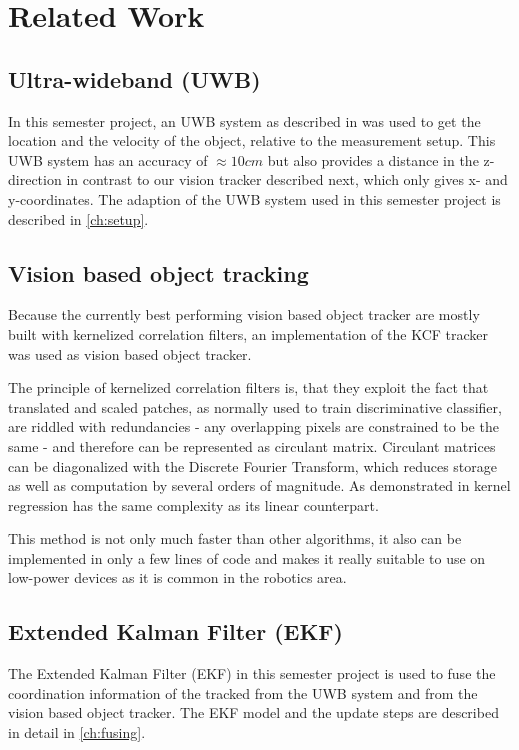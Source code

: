 
\setcounter{chapter}{1}

\chapter{Related Work}

\section{Ultra-wideband (UWB)}
In this semester project, an UWB system as described in   was used to get the location and the velocity of the object, relative to the measurement setup. This UWB system has an accuracy of $\approx 10 cm$ but also provides a distance in the z-direction in contrast to our vision tracker described next, which only gives x- and y-coordinates. The adaption of the UWB system used in this semester project is described in \autoref{ch:setup}.

\section{Vision based object tracking}
Because the currently best performing vision based object tracker are mostly built with kernelized correlation filters, an implementation of the KCF tracker \cite{henriques2015tracking} was used as vision based object tracker.

The principle of kernelized correlation filters is, that they exploit the fact that translated and scaled patches, as normally used to train discriminative classifier, are riddled with redundancies - any overlapping pixels are constrained to be the same - and therefore can be represented as circulant matrix. Circulant matrices can be diagonalized with the Discrete Fourier Transform, which reduces storage as well as computation by several orders of magnitude. As demonstrated in \cite{henriques2015tracking} kernel regression has the same complexity as its linear counterpart.

This method is not only much faster than other algorithms, it also can be implemented in only a few lines of code and makes it really suitable to use on low-power devices as it is common in the robotics area.

\section{Extended Kalman Filter (EKF)}
The Extended Kalman Filter (EKF)  in this semester project is used to fuse the coordination information of the tracked from the UWB system and from the vision based object tracker. The EKF model and the update steps are described in detail in \autoref{ch:fusing}.